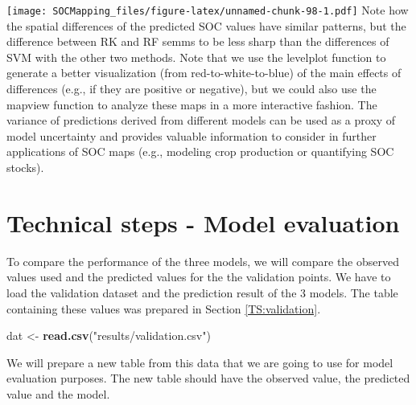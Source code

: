\documentclass[10pt,b5paper,]{book}
\newenvironment{Shaded}{\begin{snugshade}}{\end{snugshade}}
\newcommand{\KeywordTok}[1]{\textcolor[rgb]{0.13,0.29,0.53}{\textbf{#1}}}
\newcommand{\NormalTok}[1]{#1}
\newcommand{\StringTok}[1]{\textcolor[rgb]{0.31,0.60,0.02}{#1}}
\theoremstyle{definition}
\theoremstyle{definition}
\theoremstyle{definition}
\theoremstyle{remark}
\begin{document}
\texttt{[image: SOCMapping\_files/figure-latex/unnamed-chunk-98-1.pdf]}
Note how the spatial differences of the predicted SOC values have
similar patterns, but the difference between RK and RF semms to be less
sharp than the differences of SVM with the other two methods. Note that
we use the levelplot function to generate a better visualization (from
red-to-white-to-blue) of the main effects of differences (e.g., if they
are positive or negative), but we could also use the mapview function to
analyze these maps in a more interactive fashion. The variance of
predictions derived from different models can be used as a proxy of
model uncertainty and provides valuable information to consider in
further applications of SOC maps (e.g., modeling crop production or
quantifying SOC stocks).

\hypertarget{technical-steps---model-evaluation}{%
\section{Technical steps - Model
evaluation}\label{technical-steps---model-evaluation}}

To compare the performance of the three models, we will compare the
observed values used and the predicted values for the the validation
points. We have to load the validation dataset and the prediction result
of the 3 models. The table containing these values was prepared in
Section \ref{TS:validation}.

\begin{Shaded}
\begin{Highlighting}[]
\NormalTok{dat <-}\StringTok{ }\KeywordTok{read.csv}\NormalTok{(}\StringTok{"results/validation.csv"}\NormalTok{)}
\end{Highlighting}
\end{Shaded}

We will prepare a new table from this data that we are going to use for
model evaluation purposes. The new table should have the observed value,
the predicted value and the model.
\end{document}
